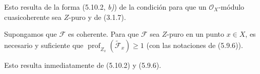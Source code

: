 
Esto resulta de la forma (5.10.2, \emph{b)}) de la condición para que un
$\mathcal O_X$-módulo cuasicoherente sea $Z$-puro y de (3.1.7).

\begin{corollary}[5.10.4]
\label{IV.2.s5.10.4-fr}
Supongamos que $\mathcal F$ es coherente. Para que $\mathcal F$ sea $Z$-puro
en un punto $x\in X$, es necesario y suficiente que
$\operatorname{prof}_{Z_x}(\widetilde{\mathcal F}_x)\geq1$
\textup{(}con las notaciones de \textup{(5.9.6))}.
\end{corollary}

Esto resulta inmediatamente de (5.10.2) y (5.9.6).
